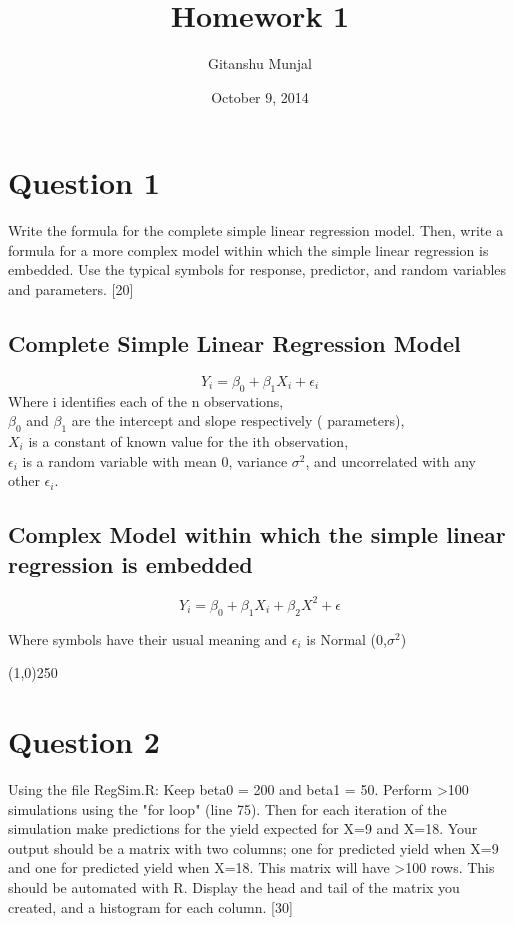 \documentclass[a4paper]{article}
\title{Homework 1}
\author{Gitanshu Munjal}
\date{October 9, 2014}
\begin{document}
\maketitle


\section{Question 1}

Write the formula for the complete simple linear regression model.  Then, write a formula for a more complex model within which the simple linear regression is embedded. Use the typical symbols for response, predictor, and random variables and parameters.  [20]

\subsection{Complete Simple Linear Regression Model}

$$Y_i=\beta_0 +\beta_1 X_i +\epsilon_i$$
Where i identifies each of the n observations,
\\ $\beta_0$ and $\beta_1$ are the intercept and slope respectively ( parameters),
\\ $X_i$ is a constant of known value for the ith observation, 
\\ $\epsilon_i$ is a random variable with mean 0, variance $\sigma^2$, and uncorrelated with any other $\epsilon_i$. 


\subsection{Complex Model within which the simple linear regression is embedded}

  
$$Y_i=\beta_0 +\beta_1 X_i +\beta_2 X^2 +\epsilon$$
  
Where symbols have their usual meaning and $\epsilon_i$ is Normal (0,$\sigma^2$) 
\begin{center}
\line(1,0){250}
\end{center}

\section{Question 2}
Using the file RegSim.R: Keep beta0 = 200 and beta1 = 50. Perform >100 simulations using the "for loop" (line 75). Then for each iteration of the simulation make predictions for the yield expected for X=9 and X=18. Your output should be a matrix with two columns; one for predicted yield when X=9 and one for predicted yield when X=18. This matrix will have >100 rows. This should be automated with R.  Display the head and tail of the matrix you created, and a histogram for each column.  [30] 
\end{document}

